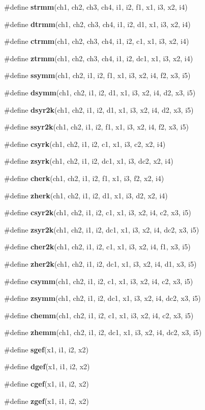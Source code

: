 \begin{CompactItemize}
\#define {\bf strmm}(ch1, ch2, ch3, ch4, i1, i2, f1, x1, i3, x2, i4)
\item 
\#define {\bf dtrmm}(ch1, ch2, ch3, ch4, i1, i2, d1, x1, i3, x2, i4)
\item 
\#define {\bf ctrmm}(ch1, ch2, ch3, ch4, i1, i2, c1, x1, i3, x2, i4)
\item 
\#define {\bf ztrmm}(ch1, ch2, ch3, ch4, i1, i2, dc1, x1, i3, x2, i4)
\item 
\#define {\bf ssymm}(ch1, ch2, i1, i2, f1, x1, i3, x2, i4, f2, x3, i5)
\item 
\#define {\bf dsymm}(ch1, ch2, i1, i2, d1, x1, i3, x2, i4, d2, x3, i5)
\item 
\#define {\bf dsyr2k}(ch1, ch2, i1, i2, d1, x1, i3, x2, i4, d2, x3, i5)
\item 
\#define {\bf ssyr2k}(ch1, ch2, i1, i2, f1, x1, i3, x2, i4, f2, x3, i5)
\item 
\#define {\bf csyrk}(ch1, ch2, i1, i2, c1, x1, i3, c2, x2, i4)
\item 
\#define {\bf zsyrk}(ch1, ch2, i1, i2, dc1, x1, i3, dc2, x2, i4)
\item 
\#define {\bf cherk}(ch1, ch2, i1, i2, f1, x1, i3, f2, x2, i4)
\item 
\#define {\bf zherk}(ch1, ch2, i1, i2, d1, x1, i3, d2, x2, i4)
\item 
\#define {\bf csyr2k}(ch1, ch2, i1, i2, c1, x1, i3, x2, i4, c2, x3, i5)
\item 
\#define {\bf zsyr2k}(ch1, ch2, i1, i2, dc1, x1, i3, x2, i4, dc2, x3, i5)
\item 
\#define {\bf cher2k}(ch1, ch2, i1, i2, c1, x1, i3, x2, i4, f1, x3, i5)
\item 
\#define {\bf zher2k}(ch1, ch2, i1, i2, dc1, x1, i3, x2, i4, d1, x3, i5)
\item 
\#define {\bf csymm}(ch1, ch2, i1, i2, c1, x1, i3, x2, i4, c2, x3, i5)
\item 
\#define {\bf zsymm}(ch1, ch2, i1, i2, dc1, x1, i3, x2, i4, dc2, x3, i5)
\item 
\#define {\bf chemm}(ch1, ch2, i1, i2, c1, x1, i3, x2, i4, c2, x3, i5)
\item 
\#define {\bf zhemm}(ch1, ch2, i1, i2, dc1, x1, i3, x2, i4, dc2, x3, i5)
\item 
\#define {\bf sgef}(x1, i1, i2, x2)
\item 
\#define {\bf dgef}(x1, i1, i2, x2)
\item 
\#define {\bf cgef}(x1, i1, i2, x2)
\item 
\#define {\bf zgef}(x1, i1, i2, x2)

\end{CompactItemize}
